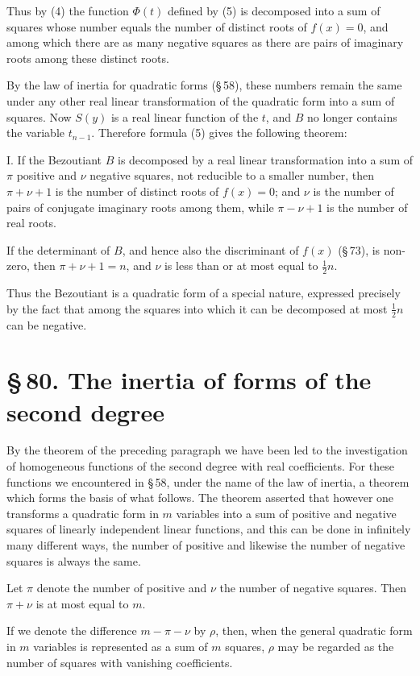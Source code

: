\documentclass[11pt]{article}
\providecommand{\sect}[2]{\section*{\S\,#1. #2}}
\begin{document}
Thus by (4) the function $\Phi(t)$ defined by (5) is decomposed into a sum of squares whose number equals the number of distinct roots of $f(x)=0$, and among which there are as many negative squares as there are pairs of imaginary roots among these distinct roots.

By the law of inertia for quadratic forms (\S\,58), these numbers remain the same under any other real linear transformation of the quadratic form into a sum of squares. Now $S(y)$ is a real linear function of the $t$, and $B$ no longer contains the variable $t_{n-1}$. Therefore formula (5) gives the following theorem:

I. If the Bezoutiant $B$ is decomposed by a real linear transformation into a sum of $\pi$ positive and $\nu$ negative squares, not reducible to a smaller number, then $\pi+\nu+1$ is the number of distinct roots of $f(x)=0$; and $\nu$ is the number of pairs of conjugate imaginary roots among them, while $\pi-\nu+1$ is the number of real roots.

If the determinant of $B$, and hence also the discriminant of $f(x)$ (\S\,73), is non-zero, then $\pi+\nu+1=n$, and $\nu$ is less than or at most equal to $\frac12n$.

Thus the Bezoutiant is a quadratic form of a special nature, expressed precisely by the fact that among the squares into which it can be decomposed at most $\frac12n$ can be negative.

\sect{80}{The inertia of forms of the second degree}

By the theorem of the preceding paragraph we have been led to the investigation of homogeneous functions of the second degree with real coefficients. For these functions we encountered in \S\,58, under the name of the law of inertia, a theorem which forms the basis of what follows. The theorem asserted that however one transforms a quadratic form in $m$ variables into a sum of positive and negative squares of linearly independent linear functions, and this can be done in infinitely many different ways, the number of positive and likewise the number of negative squares is always the same.

Let $\pi$ denote the number of positive and $\nu$ the number of negative squares. Then $\pi+\nu$ is at most equal to $m$.

If we denote the difference $m-\pi-\nu$ by $\rho$, then, when the general quadratic form in $m$ variables is represented as a sum of $m$ squares, $\rho$ may be regarded as the number of squares with vanishing coefficients.
\end{document}
